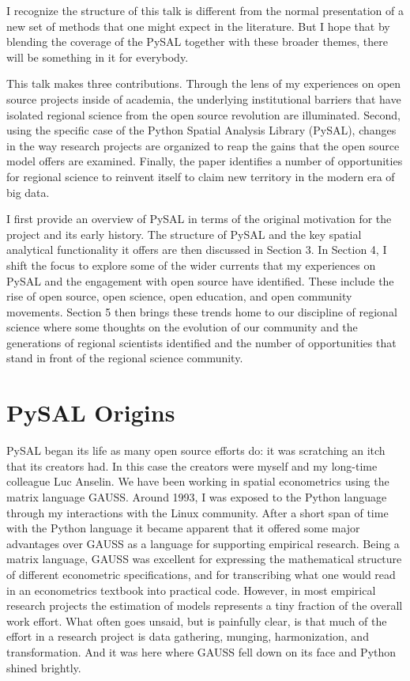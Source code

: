\documentclass[11pt]{article}
\begin{document}
I recognize the structure of this talk is different from the normal
presentation of a new set of methods that one might expect in the literature.
But I hope that by blending the coverage of the PySAL together with these
broader themes, there will be something in it for everybody.

This talk makes three contributions. Through the lens of my
experiences on open source projects inside of academia, the underlying
institutional barriers that have isolated regional science from the open source
revolution are illuminated. Second, using the specific case of the Python
Spatial Analysis Library (PySAL), changes in the way research projects are
organized to reap the gains that the open source model offers are examined.
Finally, the paper identifies a number of opportunities for regional science to
reinvent itself to claim new territory in the modern era of big data.

I first provide an overview of PySAL in terms of the original motivation for
the project and its early history. The structure of PySAL and the key spatial
analytical functionality it offers are then discussed in Section 3. In Section
4, I shift the focus to explore some of the wider currents that my experiences
on PySAL and the engagement with open source have identified. These include the
rise of open source, open science, open education, and open community
movements. Section 5 then brings these trends home to our discipline of
regional science where some thoughts on the evolution of our community and the
generations of regional scientists identified and the number of opportunities
that stand in front of the regional science community.

\section*{PySAL Origins}
\label{sec:org8714604}
PySAL began its life as many open source efforts do: it was scratching
an itch that its creators had. In this case the creators were myself and my
long-time colleague Luc Anselin. We have been working in spatial econometrics
using the matrix language GAUSS. Around 1993, I was exposed to the Python
language through my interactions with the Linux community. After a short span of
time with the Python language it became apparent that it offered some major
advantages over GAUSS as a language for supporting empirical research. Being a
matrix language, GAUSS was excellent for expressing the mathematical structure
of different econometric specifications, and for transcribing what one would
read in an econometrics textbook into practical code. However, in most empirical
research projects the estimation of models represents a tiny fraction of the
overall work effort. What often goes unsaid, but is painfully clear, is that
much of the effort in a research project is data gathering, munging,
harmonization, and transformation. And it was here where GAUSS fell down on its
face and Python shined brightly.
\end{document}

